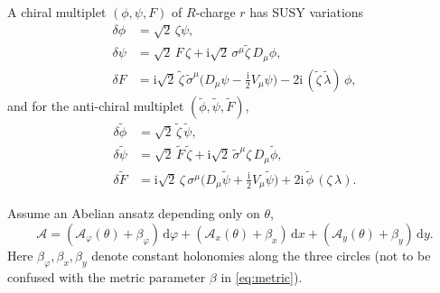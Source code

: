 \documentclass[11pt,a4paper]{article}
\numberwithin{equation}{section}
\theoremstyle{plain}
\theoremstyle{definition}
\theoremstyle{remark}
\newcommand{\ii}{\mathrm{i}}
\newcommand{\dd}{\mathrm{d}}
\newcommand{\nn}{\nonumber}
\begin{document}
A chiral multiplet $(\phi,\psi,F)$ of $R$-charge $r$ has SUSY variations
\begin{align}
\delta \phi & = \sqrt{2}\,\zeta \psi,
\nn\\
\delta \psi & = \sqrt{2}\,F\,\zeta + \ii\sqrt{2}\,\sigma^\mu\widetilde{\zeta}\,D_\mu \phi,
\nn\\
\delta F & = \ii\sqrt{2}\,\widetilde{\zeta}\,\widetilde{\sigma}^\mu\Big(D_\mu\psi-\frac{\ii}{2}V_\mu\psi\Big)
-2\ii\,(\widetilde{\zeta}\,\widetilde{\lambda})\,\phi,
\label{eq:cm-susy}
\end{align}
and for the anti-chiral multiplet $(\widetilde{\phi},\widetilde{\psi},\widetilde{F})$,
\begin{align}
\delta \widetilde{\phi} & = \sqrt{2}\,\widetilde{\zeta}\,\widetilde{\psi},
\nn\\
\delta \widetilde{\psi} & = \sqrt{2}\,\widetilde{F}\,\widetilde{\zeta}
+ \ii\sqrt{2}\,\widetilde{\sigma}^\mu\zeta\,D_\mu\widetilde{\phi},
\nn\\
\delta \widetilde{F} & = \ii\sqrt{2}\,\zeta\,\sigma^\mu\Big(D_\mu\widetilde{\psi}+\frac{\ii}{2}V_\mu\widetilde{\psi}\Big)
+2\ii\,\widetilde{\phi}\,(\zeta\,\lambda).
\label{eq:acm-susy}
\end{align}


Assume an Abelian ansatz depending only on $\theta$,
\begin{equation}
\mathcal A
=
(\mathcal A_\varphi(\theta)+\beta_\varphi)\,\dd\varphi
+
(\mathcal A_x(\theta)+\beta_x)\,\dd x
+
(\mathcal A_y(\theta)+\beta_y)\,\dd y.
\label{eq:a-ansatz}
\end{equation}
Here $\beta_\varphi,\beta_x,\beta_y$ denote constant holonomies along the three circles
(not to be confused with the metric parameter $\beta$ in \eqref{eq:metric}).
\end{document}
